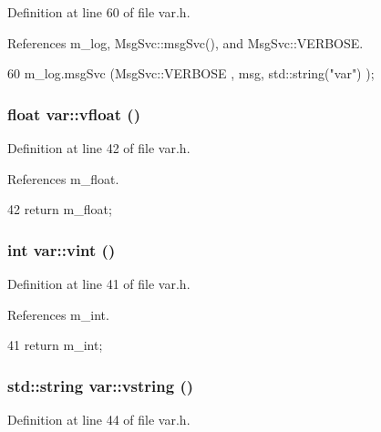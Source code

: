 Definition at line 60 of file var.h.

References m\_\-log, MsgSvc::msgSvc(), and MsgSvc::VERBOSE.


\begin{DoxyCode}
60 { m_log.msgSvc (MsgSvc::VERBOSE , msg, std::string("var") ); }
\end{DoxyCode}
\hypertarget{classvar_ac811c23f3fcb941746c1dd419e68b501}{
\subsubsection[{vfloat}]{\setlength{\rightskip}{0pt plus 5cm}float var::vfloat ()}}
\label{classvar_ac811c23f3fcb941746c1dd419e68b501}


Definition at line 42 of file var.h.

References m\_\-float.


\begin{DoxyCode}
42 { return m_float; }
\end{DoxyCode}
\hypertarget{classvar_a84535a30ae85f19acb935fcc98a03abf}{
\subsubsection[{vint}]{\setlength{\rightskip}{0pt plus 5cm}int var::vint ()}}
\label{classvar_a84535a30ae85f19acb935fcc98a03abf}


Definition at line 41 of file var.h.

References m\_\-int.


\begin{DoxyCode}
41 { return m_int; }
\end{DoxyCode}
\hypertarget{classvar_ada169cb1305db45a1de31071ce5033e2}{
\subsubsection[{vstring}]{\setlength{\rightskip}{0pt plus 5cm}std::string var::vstring ()}}
\label{classvar_ada169cb1305db45a1de31071ce5033e2}


Definition at line 44 of file var.h.


